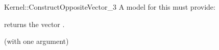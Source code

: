 \begin{ccRefFunctionObjectConcept}{Kernel::ConstructOppositeVector_3}
A model for this must provide:


{returns the vector .}

\ccRefines
{} (with one argument)

\ccSeeAlso
{}  \\

\end{ccRefFunctionObjectConcept}

